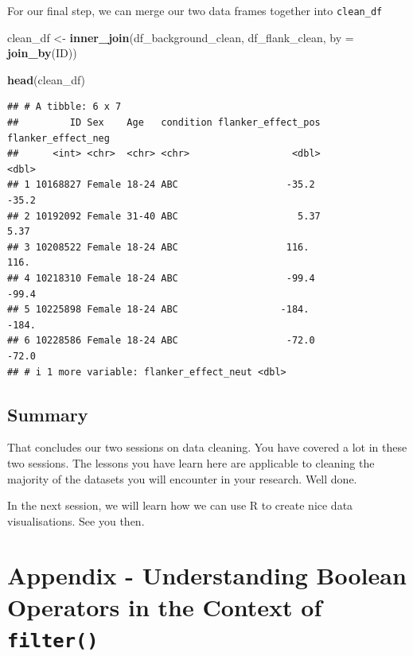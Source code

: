 \documentclass[
]{book}
\newenvironment{Shaded}{\begin{snugshade}}{\end{snugshade}}
\newcommand{\AttributeTok}[1]{\textcolor[rgb]{0.13,0.29,0.53}{#1}}
\newcommand{\FunctionTok}[1]{\textcolor[rgb]{0.13,0.29,0.53}{\textbf{#1}}}
\newcommand{\NormalTok}[1]{#1}
\newcommand{\OtherTok}[1]{\textcolor[rgb]{0.56,0.35,0.01}{#1}}
\begin{document}
For our final step, we can merge our two data frames together into \texttt{clean\_df}

\begin{Shaded}
\begin{Highlighting}[]
\NormalTok{clean\_df }\OtherTok{\textless{}{-}} \FunctionTok{inner\_join}\NormalTok{(df\_background\_clean, df\_flank\_clean, }\AttributeTok{by =} \FunctionTok{join\_by}\NormalTok{(ID))}

\FunctionTok{head}\NormalTok{(clean\_df)}
\end{Highlighting}
\end{Shaded}

\begin{verbatim}
## # A tibble: 6 x 7
##         ID Sex    Age   condition flanker_effect_pos flanker_effect_neg
##      <int> <chr>  <chr> <chr>                  <dbl>              <dbl>
## 1 10168827 Female 18-24 ABC                   -35.2              -35.2 
## 2 10192092 Female 31-40 ABC                     5.37               5.37
## 3 10208522 Female 18-24 ABC                   116.               116.  
## 4 10218310 Female 18-24 ABC                   -99.4              -99.4 
## 5 10225898 Female 18-24 ABC                  -184.              -184.  
## 6 10228586 Female 18-24 ABC                   -72.0              -72.0 
## # i 1 more variable: flanker_effect_neut <dbl>
\end{verbatim}

\hypertarget{summary-8}{%
\section{Summary}\label{summary-8}}

That concludes our two sessions on data cleaning. You have covered a lot in these two sessions. The lessons you have learn here are applicable to cleaning the majority of the datasets you will encounter in your research. Well done.

In the next session, we will learn how we can use R to create nice data visualisations. See you then.

\hypertarget{appendix---understanding-boolean-operators-in-the-context-of-filter}{%
\chapter{\texorpdfstring{Appendix - Understanding Boolean Operators in the Context of \texttt{filter()}}{Appendix - Understanding Boolean Operators in the Context of filter()}}\label{appendix---understanding-boolean-operators-in-the-context-of-filter}}
\end{document}
